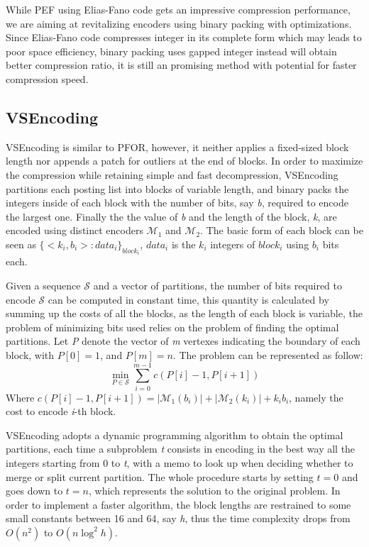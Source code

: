 \documentclass[runningheads,a4paper]{llncs}
\begin{document}
While PEF using Elias-Fano code gets an impressive compression performance, we are aiming at revitalizing encoders using binary packing with optimizations. Since Elias-Fano code compresses integer in its complete form which may leads to poor space efficiency, binary packing uses gapped integer instead will obtain better compression ratio, it is still an promising method with potential for faster compression speed.

\subsection{VSEncoding}

VSEncoding is similar to PFOR, however, it neither applies a fixed-sized block length nor appends a patch for outliers at the end of blocks. In order to maximize the compression while retaining simple and fast decompression, VSEncoding partitions each posting list into blocks of variable length, and binary packs the integers inside of each block with the number of bits, say \textit{b}, required to encode the largest one. Finally the the value of \textit{b} and the length of the block, \textit{k}, are encoded using distinct encoders $ \mathcal{M}_{1} $ and $ \mathcal{M}_{2} $. The basic form of each block can be seen as $ \{<k_{i},b_{i}>: data_{i}\}_{block_{i}} $, $ data_{i} $ is the $ k_{i} $ integers of $ block_{i} $ using $ b_{i} $ bits each.

Given a sequence $\mathcal{S}$ and a vector of partitions, the number of bits required to encode $\mathcal{S}$ can be computed in constant time, this quantity is calculated by summing up the costs of all the blocks, as the length of each block is variable, the problem of minimizing bits used relies on the problem of finding the optimal partitions. Let \textit{P} denote the vector of \textit{m} vertexes indicating the boundary of each block, with $ P\left[ 0 \right]  = 1 $, and $ P\left[ m \right]  = n $. The problem can be represented as follow:
\begin{equation*}
\min_{P\in\mathcal{S}}\sum_{i=0}^{m-1}c\left(P\left[i\right]-1,P\left[i+1\right]\right )
\end{equation*}
Where $c\left(P\left[i\right]-1,P\left[i+1\right]\right )=|\mathcal{M}_{1}\left( b_{i}\right) |+|\mathcal{M}_{2}\left( k_{i}\right) |+k_{i}b_{i}$, namely the cost to encode \textit{i}-th block.

VSEncoding adopts a dynamic programming algorithm to obtain the optimal partitions, each time a subproblem \textit{t} consists in encoding in the best way all the integers starting from 0 to \textit{t}, with a memo to look up when deciding whether to merge or split current partition. The whole procedure starts by setting $t = 0$ and goes down to $t = n$, which represents the solution to the original problem. In order to implement a faster algorithm, the block lengths are restrained to some small constants between 16 and 64, say \textit{h}, thus the time complexity drops from $ O\left(n^{2}\right) $ to $ O\left(n\log^{2}h\right) $.
\end{document}
